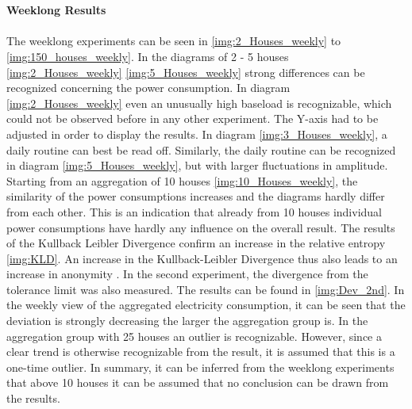 \\
\\
\textbf{Weeklong Results}
\\
\\
The weeklong experiments can be seen in \ref{img:2_Houses_weekly} to \ref{img:150_houses_weekly}. In the diagrams of 2 - 5 houses \ref{img:2_Houses_weekly} \ref{img:5_Houses_weekly} strong differences can be recognized concerning the power consumption.
In diagram \ref{img:2_Houses_weekly} even an unusually high baseload is recognizable, which could not be observed before in any other experiment. The Y-axis had to be adjusted in order to display the results. In diagram \ref{img:3_Houses_weekly}, a daily routine can best be read off. Similarly, the daily routine can be recognized in diagram \ref{img:5_Houses_weekly}, but with larger fluctuations in amplitude. Starting from an aggregation of 10 houses \ref{img:10_Houses_weekly}, the similarity of the power consumptions increases and the diagrams hardly differ from each other. This is an indication that already from 10 houses individual power consumptions have hardly any influence on the overall result. The results of the Kullback Leibler Divergence confirm an increase in the relative entropy \ref{img:KLD}. An increase in the Kullback-Leibler Divergence thus also leads to an increase in anonymity \cite{kalogridis2010privacy}.
In the second experiment, the divergence from the tolerance limit was also measured. The results can be found in \ref{img:Dev_2nd}. In the weekly view of the aggregated electricity consumption, it can be seen that the deviation is strongly decreasing the larger the aggregation group is. In the aggregation group with 25 houses an outlier is recognizable. However, since a clear trend is otherwise recognizable from the result, it is assumed that this is a one-time outlier. In summary, it can be inferred from the weeklong experiments that above 10 houses it can be assumed that no conclusion can be drawn from the results.


\clearpage

